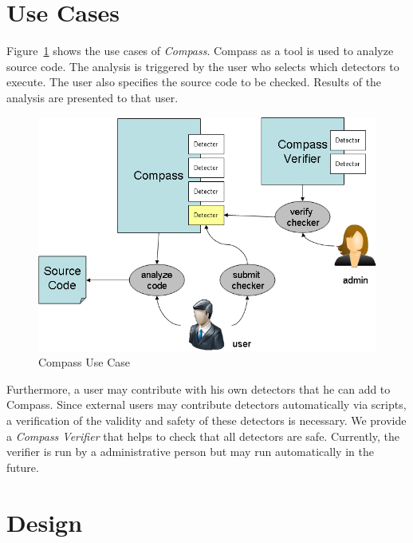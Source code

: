 \section{Use Cases}

\label{design::UseCase}

Figure~\ref{Compass_usecase} shows the use cases of \emph{Compass}.
Compass as a tool is used to analyze source code. The analysis is triggered by the user who
selects which detectors to execute. The user also specifies the source code to be checked.
Results of the analysis are presented to that user.

\begin{figure}[th]
\includegraphics[width=4.5in]{compass_pic.png}
\caption{Compass Use Case}
\label{Compass_usecase}
\end{figure}

Furthermore, a user may contribute with his own detectors that he can add to Compass. Since 
external users may contribute detectors automatically via scripts, a verification of the 
validity and safety of these detectors is necessary. We provide a \emph{Compass Verifier}
that helps to check that all detectors are safe. Currently, the verifier is run by
a administrative person but may run automatically in the future.



\section{Design}

